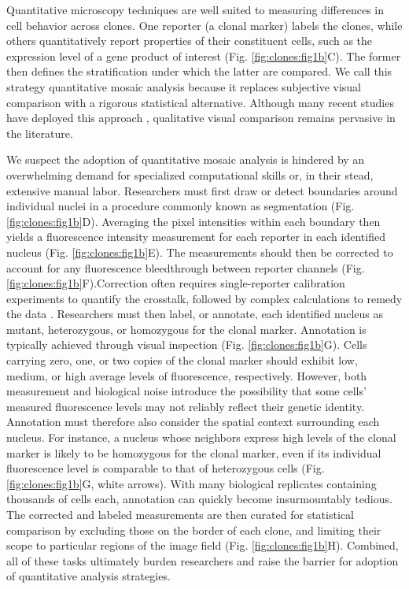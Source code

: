 Quantitative microscopy techniques are well suited to measuring differences in cell behavior across clones. One reporter (a clonal marker) labels the clones, while others quantitatively report properties of their constituent cells, such as the expression level of a gene product of interest (Fig. \ref{fig:clones:fig1b}C). The former then defines the stratification under which the latter are compared. We call this strategy quantitative mosaic analysis because it replaces subjective visual comparison with a rigorous statistical alternative. Although many recent studies have deployed this approach \cite{Dai2017,Bernasek2018,Ghiglione2018,Li2018}, qualitative visual comparison remains pervasive in the literature.

We suspect the adoption of quantitative mosaic analysis is hindered by an overwhelming demand for specialized computational skills or, in their stead, extensive manual labor. Researchers must first draw or detect boundaries around individual nuclei in a procedure commonly known as segmentation (Fig. \ref{fig:clones:fig1b}D). Averaging the pixel intensities within each boundary then yields a fluorescence intensity measurement for each reporter in each identified nucleus (Fig. \ref{fig:clones:fig1b}E). The measurements should then be corrected to account for any fluorescence bleedthrough between reporter channels (Fig. \ref{fig:clones:fig1b}F).Correction often requires single-reporter calibration experiments to quantify the crosstalk, followed by complex calculations to remedy the data \cite{Bacia2012,Elangovan2003}. Researchers must then label, or annotate, each identified nucleus as mutant, heterozygous, or homozygous for the clonal marker. Annotation is typically achieved through visual inspection (Fig. \ref{fig:clones:fig1b}G). Cells carrying zero, one, or two copies of the clonal marker should exhibit low, medium, or high average levels of fluorescence, respectively. However, both measurement and biological noise introduce the possibility that some cells’ measured fluorescence levels may not reliably reflect their genetic identity. Annotation must therefore also consider the spatial context surrounding each nucleus. For instance, a nucleus whose neighbors express high levels of the clonal marker is likely to be homozygous for the clonal marker, even if its individual fluorescence level is comparable to that of heterozygous cells (Fig. \ref{fig:clones:fig1b}G, white arrows). With many biological replicates containing thousands of cells each, annotation can quickly become insurmountably tedious. The corrected and labeled measurements are then curated for statistical comparison by excluding those on the border of each clone, and limiting their scope to particular regions of the image field (Fig. \ref{fig:clones:fig1b}H). Combined, all of these tasks ultimately burden researchers and raise the barrier for adoption of quantitative analysis strategies. 

